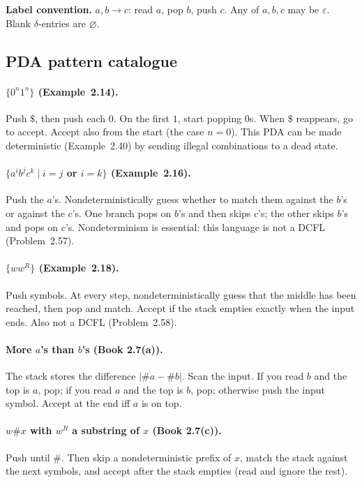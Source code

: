 \documentclass[11pt,a4paper]{article}
\newcommand{\eps}{\varepsilon}
\begin{document}
\textbf{Label convention.}
$a,b\to c$: read $a$, pop $b$, push $c$. Any of $a,b,c$ may be
$\eps$. Blank $\delta$-entries are $\varnothing$.

\subsection{PDA pattern catalogue}

\paragraph{$\{0^n1^n\}$ (Example~2.14).}
Push $\$$, then push each $0$. On the first $1$, start popping $0$s.
When $\$$ reappears, go to accept. Accept also from the start
(the case $n=0$). This PDA can be made deterministic
(Example~2.40) by sending illegal combinations to a dead state.

\paragraph{$\{a^ib^jc^k\mid i=j$ or $i=k\}$ (Example~2.16).}
Push the $a$'s. Nondeterministically guess whether to match them
against the $b$'s or against the $c$'s. One branch pops on $b$'s
and then skips $c$'s; the other skips $b$'s and pops on $c$'s.
Nondeterminism is essential: this language is not a DCFL
(Problem~2.57).

\paragraph{$\{ww^R\}$ (Example~2.18).}
Push symbols. At every step, nondeterministically guess that the
middle has been reached, then pop and match. Accept if the stack
empties exactly when the input ends. Also not a DCFL
(Problem~2.58).

\paragraph{More $a$'s than $b$'s (Book 2.7(a)).}
The stack stores the difference $|\#a-\#b|$. Scan the input. If
you read $b$ and the top is $a$, pop; if you read $a$ and the top
is $b$, pop; otherwise push the input symbol. Accept at the end
iff $a$ is on top.

\paragraph{$w\#x$ with $w^R$ a substring of $x$ (Book 2.7(c)).}
Push until $\#$. Then skip a nondeterministic prefix of $x$, match
the stack against the next symbols, and accept after the stack
empties (read and ignore the rest).
\end{document}
